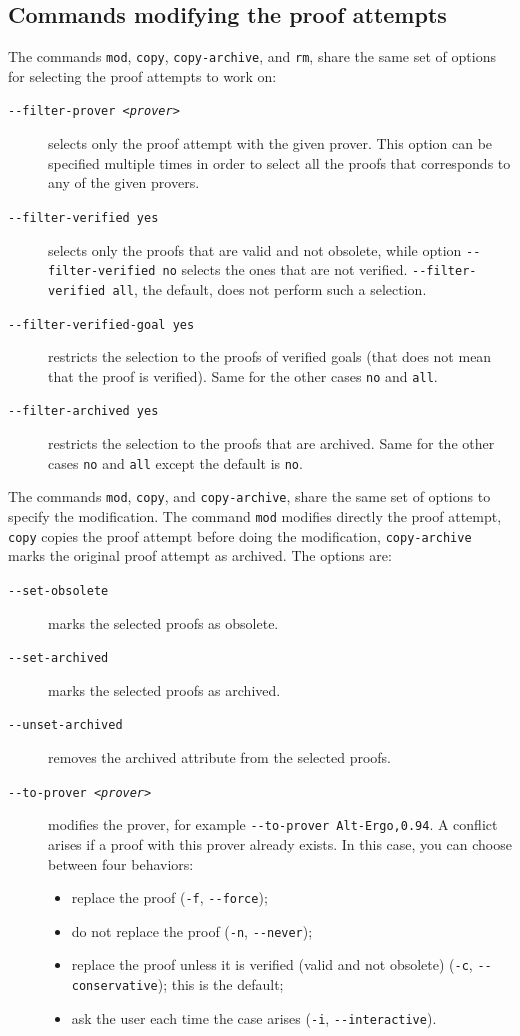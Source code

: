 \subsection{Commands modifying the proof attempts}

The commands \texttt{mod}, \texttt{copy}, \texttt{copy-archive},
and \texttt{rm}, share the same set of options for selecting the proof
attempts to work on:
\begin{description}
\item[\texttt{-{}-filter-prover \textsl{<prover>}}] selects only the proof attempt with
  the given prover. This option can be specified multiple times in order
  to select all the proofs that corresponds to any of the given
  provers.
\item[\texttt{-{}-filter-verified yes}] selects only
  the proofs that are valid and not obsolete, while option
  \verb|--filter-verified no| selects the ones that are not verified.
  \verb|--filter-verified all|, the default, does not perform such a selection.
\item[\texttt{-{}-filter-verified-goal yes}] restricts the selection
  to the proofs of verified goals (that does not mean that the proof is
  verified). Same for the other cases \verb|no| and \verb|all|.
\item[\texttt{-{}-filter-archived yes}] restricts the selection
  to the proofs that are archived.
  Same for the other cases \verb|no|
  and \verb|all| except the default is \verb|no|.
\end{description}

\noindent
The commands \texttt{mod}, \texttt{copy}, and \texttt{copy-archive},
share the same set of options to specify the modification. The
command \texttt{mod} modifies directly the proof attempt,
\texttt{copy} copies the proof attempt before doing the modification,
\texttt{copy-archive} marks the original proof attempt as
archived.
The options are:
\begin{description}
\item[\texttt{-{}-set-obsolete}] marks the selected proofs as
  obsolete.
\item[\texttt{-{}-set-archived}] marks the selected proofs as archived.
\item[\texttt{-{}-unset-archived}] removes the archived attribute
  from the selected proofs.
\item[\texttt{-{}-to-prover \textsl{<prover>}}] modifies the prover, for example
  \texttt{-{}-to-prover Alt-Ergo,0.94}. A conflict arises if a proof
  with this prover already exists. In this case, you can choose between four
  behaviors:
\begin{itemize}
\item replace the proof (\verb|-f|, \verb|--force|);
\item do not replace the proof (\verb|-n|, \verb|--never|);
\item replace the proof unless it is verified (valid and not
  obsolete) (\verb|-c|, \verb|--conservative|); this is the default;
\item ask the user each time the case arises (\verb|-i|, \verb|--interactive|).
\end{itemize}
\end{description}

